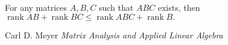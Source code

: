 \documentclass[12pt]{article}
\begin{document}
For any matrices $A$,\,$B$,\,$C$ such that $ABC$ exists, then
$\operatorname{rank} AB + \operatorname{rank} BC \leq \operatorname{rank} ABC+
\operatorname{rank} B.$
\begin{thebibliography}{9}
 Carl D. Meyer
\emph{Matrix Analysis and Applied Linear Algebra}
\end{thebibliography}
\end{document}
